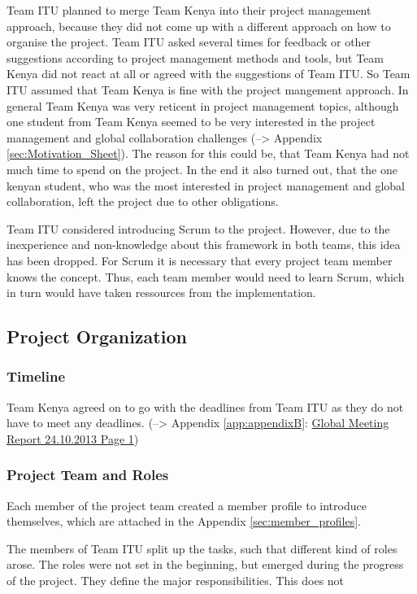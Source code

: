 Team ITU planned to merge Team Kenya into their project management approach, because they did not come up with a different approach on how to organise the project. Team ITU asked several times for feedback or other suggestions according to project management methods and tools, but Team Kenya did not react at all or agreed with the suggestions of Team ITU. So Team ITU assumed that Team Kenya is fine with the project mangement approach. In general Team Kenya was very reticent in project management topics, although one student from Team Kenya seemed to be very interested in the project management and global collaboration challenges (--> Appendix \ref{sec:Motivation_Sheet}). The reason for this could be, that Team Kenya had not much time to spend on the project. In the end it also turned out, that the one kenyan student, who was the most interested in project management and global collaboration, left the project due to other obligations.

Team ITU considered introducing Scrum to the project. However, due to the inexperience and non-knowledge about this framework in both teams, this idea has been dropped. For Scrum it is necessary that every project team member knows the concept. Thus, each team member would need to learn Scrum, which in turn would have taken ressources from the implementation.


\subsection{Project Organization}

\subsubsection{Timeline}
Team Kenya agreed on to go with the deadlines from Team ITU as they do not have to meet any deadlines. (--> Appendix \ref{app:appendixB}: \hyperlink{GSD20131024.1}{Global Meeting Report 24.10.2013 Page 1})

\subsubsection{Project Team and Roles}
Each member of the project team created a member profile to introduce themselves, which are attached in the Appendix \ref{sec:member_profiles}.

The members of Team ITU split up the tasks, such that different kind of roles arose. The roles were not set in the beginning, but emerged during the progress of the project. They define the major responsibilities. This does not

